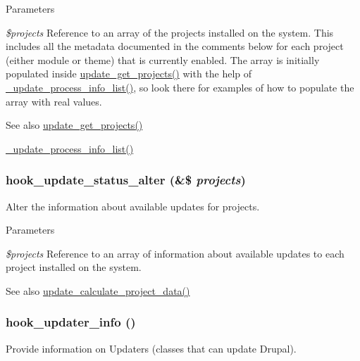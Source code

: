\begin{DoxyParams}{Parameters}
\item[{\em \$projects}]Reference to an array of the projects installed on the system. This includes all the metadata documented in the comments below for each project (either module or theme) that is currently enabled. The array is initially populated inside \hyperlink{update_8compare_8inc_a7e1ea49d91f2d2b81b8101d481d10300}{update\_\-get\_\-projects()} with the help of \hyperlink{update_8compare_8inc_a37eb8774bbb961b5d1113c116aba2f3b}{\_\-update\_\-process\_\-info\_\-list()}, so look there for examples of how to populate the array with real values.\end{DoxyParams}
\begin{DoxySeeAlso}{See also}
\hyperlink{update_8compare_8inc_a7e1ea49d91f2d2b81b8101d481d10300}{update\_\-get\_\-projects()} 

\hyperlink{update_8compare_8inc_a37eb8774bbb961b5d1113c116aba2f3b}{\_\-update\_\-process\_\-info\_\-list()} 
\end{DoxySeeAlso}
\hypertarget{group__hooks_ga62b22dcd7e2e14b061cedd46a7862352}{
\subsubsection[{hook\_\-update\_\-status\_\-alter}]{\setlength{\rightskip}{0pt plus 5cm}hook\_\-update\_\-status\_\-alter (\&\$ {\em projects})}}
\label{group__hooks_ga62b22dcd7e2e14b061cedd46a7862352}
Alter the information about available updates for projects.


\begin{DoxyParams}{Parameters}
\item[{\em \$projects}]Reference to an array of information about available updates to each project installed on the system.\end{DoxyParams}
\begin{DoxySeeAlso}{See also}
\hyperlink{update_8compare_8inc_aa0663304dc4634e4109c896f214ea791}{update\_\-calculate\_\-project\_\-data()} 
\end{DoxySeeAlso}
\hypertarget{group__hooks_gafb9b375716a0ad02d35250dc252b3c99}{
\subsubsection[{hook\_\-updater\_\-info}]{\setlength{\rightskip}{0pt plus 5cm}hook\_\-updater\_\-info ()}}
\label{group__hooks_gafb9b375716a0ad02d35250dc252b3c99}
Provide information on Updaters (classes that can update Drupal).


